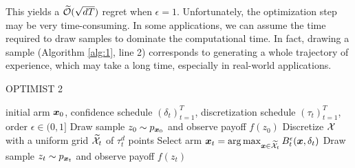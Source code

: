 \documentclass{article}
\makeatletter
\DeclareRobustCommand{\algoname}{OPTIMIST\@\xspace}
\makeatother
\begin{document}
%
This yields a $\widetilde{\mathcal{O}}(\sqrt{dT})$ regret when $\epsilon=1$. Unfortunately, the optimization step may be very time-consuming. In some applications, we can assume the time required to draw samples to dominate the computational time. In fact, drawing a sample (Algorithm \ref{alg:1}, line 2) corresponds to generating a whole trajectory of experience, which may take a long time, especially in real-world applications.

\begin{algorithm}[t]
	\caption{\algoname2}
	\label{alg:2}
	\begin{algorithmic}[1]
		 initial arm $\boldsymbol{x}_0$, confidence schedule $(\delta_t)_{t=1}^T$, discretization schedule $(\tau_t)_{t=1}^T$, order $\epsilon\in(0,1]$
		\STATE Draw sample $z_0\sim p_{\boldsymbol{x}_0}$ and observe payoff $f(z_0)$
		\STATE Discretize $\mathcal{X}$ with a uniform grid $\widetilde{\mathcal{X}}_t$ of $\tau_t^d$ points
		\STATE Select arm $\boldsymbol{x}_t = \arg\max_{\boldsymbol{x}\in\widetilde{\mathcal{X}}_t}B_t^{\epsilon}(\boldsymbol{x},\delta_t)$
		\STATE Draw sample $z_t\sim p_{\boldsymbol{x}_t}$ and observe payoff $f(z_t)$
		\ENDFOR
	\end{algorithmic}
\end{algorithm}
%
\end{document}
